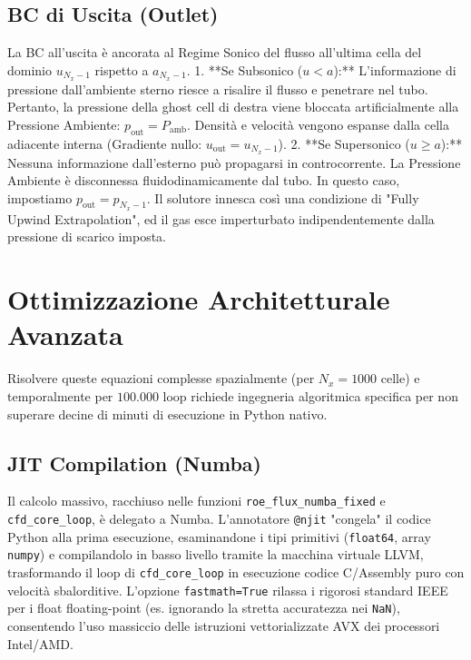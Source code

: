 \documentclass[11pt,a4paper]{article}
\begin{document}
\subsection{BC di Uscita (Outlet)}
La BC all'uscita è ancorata al Regime Sonico del flusso all'ultima cella del dominio $u_{N_x-1}$ rispetto a $a_{N_x-1}$.
1. **Se Subsonico ($u < a$):** L'informazione di pressione dall'ambiente sterno riesce a risalire il flusso e penetrare nel tubo. Pertanto, la pressione della ghost cell di destra viene bloccata artificialmente alla Pressione Ambiente: $p_{\text{out}} = P_{\text{amb}}$. Densità e velocità vengono espanse dalla cella adiacente interna (Gradiente nullo: $u_{\text{out}} = u_{N_x-1}$).
2. **Se Supersonico ($u \geq a$):** Nessuna informazione dall'esterno può propagarsi in controcorrente. La Pressione Ambiente è disconnessa fluidodinamicamente dal tubo. In questo caso, impostiamo $p_{\text{out}} = p_{N_x-1}$. Il solutore innesca così una condizione di "Fully Upwind Extrapolation", ed il gas esce imperturbato indipendentemente dalla pressione di scarico imposta.

\section{Ottimizzazione Architetturale Avanzata}

Risolvere queste equazioni complesse spazialmente (per $N_x = 1000$ celle) e temporalmente per $100.000$ loop richiede ingegneria algoritmica specifica per non superare decine di minuti di esecuzione in Python nativo.

\subsection{JIT Compilation (Numba)}
Il calcolo massivo, racchiuso nelle funzioni \texttt{roe\_flux\_numba\_fixed} e \texttt{cfd\_core\_loop}, è delegato a Numba. L'annotatore \texttt{@njit} "congela" il codice Python alla prima esecuzione, esaminandone i tipi primitivi (\texttt{float64}, array \texttt{numpy}) e compilandolo in basso livello tramite la macchina virtuale LLVM, trasformando il loop di \texttt{cfd\_core\_loop} in esecuzione codice C/Assembly puro con velocità sbalorditive.
L'opzione \texttt{fastmath=True} rilassa i rigorosi standard IEEE per i float floating-point (es. ignorando la stretta accuratezza nei \texttt{NaN}), consentendo l'uso massiccio delle istruzioni vettorializzate AVX dei processori Intel/AMD.
\end{document}
